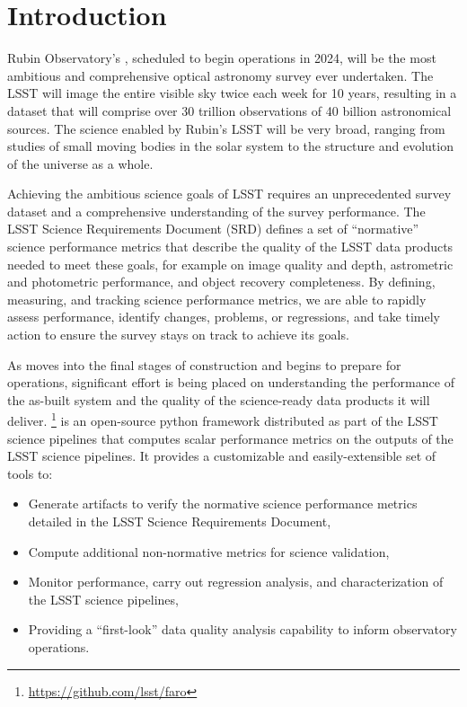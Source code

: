 \section{Introduction} \label{sec:intro}

Rubin Observatory's \lsst, scheduled to begin operations in 2024, will be the most ambitious and comprehensive optical astronomy survey ever undertaken\cite{2019ApJ...873..111I}.
The LSST will image the entire visible sky twice each week for 10 years, resulting in a dataset that will comprise over 30 trillion observations of 40 billion astronomical sources.
The science enabled by Rubin's LSST will be very broad, ranging from studies of small moving bodies in the solar system to the structure and evolution of the universe as a whole. 

Achieving the ambitious science goals of LSST requires an unprecedented survey dataset and a comprehensive understanding of the survey performance. 
The LSST Science Requirements Document (SRD)\cite{LPM-17} defines a set of ``normative'' science performance metrics that describe the quality of the LSST data products needed to meet these goals, for example on image quality and depth, astrometric and photometric performance, and object recovery completeness.
By defining, measuring, and tracking science performance metrics, we are able to rapidly assess performance, identify changes, problems, or regressions, and take timely action to ensure the survey stays on track to achieve its goals.

As \ro moves into the final stages of construction and begins to prepare for operations, significant effort is being placed on understanding the performance of the as-built system and the quality of the science-ready data products it will deliver.
\faro\footnote{\url{https://github.com/lsst/faro}} is an open-source python framework distributed as part of the LSST science pipelines\cite{2019ASPC..523..521B,2018PASJ...70S...5B} that computes scalar performance metrics on the outputs of the LSST science pipelines.
It provides a customizable and easily-extensible set of tools to:
\begin{itemize}
\item Generate artifacts to verify the normative science performance metrics detailed in the LSST Science Requirements Document,
\item Compute additional non-normative metrics for science validation, 
\item Monitor performance, carry out regression analysis, and characterization of the LSST science pipelines, 
\item Providing a ``first-look'' data quality analysis capability to inform observatory operations.
\end{itemize}


